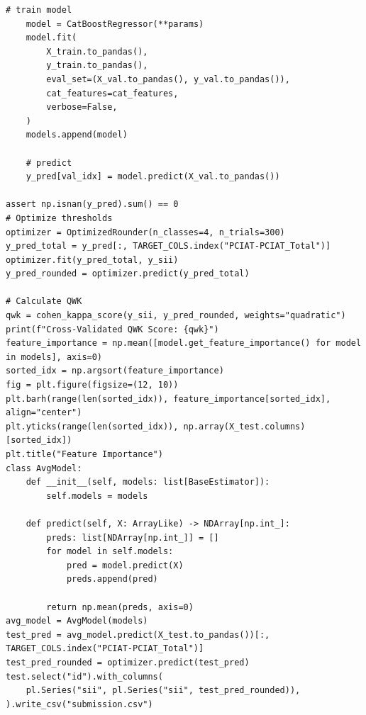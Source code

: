 \documentclass[11pt]{extarticle}
\begin{document}
\begin{mdframed}
\begin{lstlisting}[breaklines=true]
    # train model
    model = CatBoostRegressor(**params)
    model.fit(
        X_train.to_pandas(),
        y_train.to_pandas(),
        eval_set=(X_val.to_pandas(), y_val.to_pandas()),
        cat_features=cat_features,
        verbose=False,
    )
    models.append(model)

    # predict
    y_pred[val_idx] = model.predict(X_val.to_pandas())

assert np.isnan(y_pred).sum() == 0
# Optimize thresholds
optimizer = OptimizedRounder(n_classes=4, n_trials=300)
y_pred_total = y_pred[:, TARGET_COLS.index("PCIAT-PCIAT_Total")]
optimizer.fit(y_pred_total, y_sii)
y_pred_rounded = optimizer.predict(y_pred_total)

# Calculate QWK
qwk = cohen_kappa_score(y_sii, y_pred_rounded, weights="quadratic")
print(f"Cross-Validated QWK Score: {qwk}")
feature_importance = np.mean([model.get_feature_importance() for model in models], axis=0)
sorted_idx = np.argsort(feature_importance)
fig = plt.figure(figsize=(12, 10))
plt.barh(range(len(sorted_idx)), feature_importance[sorted_idx], align="center")
plt.yticks(range(len(sorted_idx)), np.array(X_test.columns)[sorted_idx])
plt.title("Feature Importance")
class AvgModel:
    def __init__(self, models: list[BaseEstimator]):
        self.models = models

    def predict(self, X: ArrayLike) -> NDArray[np.int_]:
        preds: list[NDArray[np.int_]] = []
        for model in self.models:
            pred = model.predict(X)
            preds.append(pred)

        return np.mean(preds, axis=0)
avg_model = AvgModel(models)
test_pred = avg_model.predict(X_test.to_pandas())[:, TARGET_COLS.index("PCIAT-PCIAT_Total")]
test_pred_rounded = optimizer.predict(test_pred)
test.select("id").with_columns(
    pl.Series("sii", pl.Series("sii", test_pred_rounded)),
).write_csv("submission.csv")
\end{lstlisting}
\end{mdframed}
\end{document}
